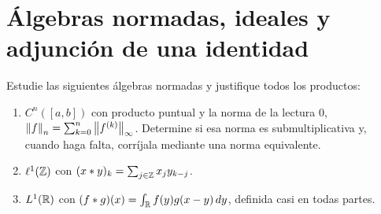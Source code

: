 \chapter{Álgebras normadas, ideales y adjunción de una identidad}

\begin{ejercicio}\label{ej:v3-l19-1}
Estudie las siguientes álgebras normadas y justifique todos los productos:
\begin{enumerate}
\item $C^n([a,b])$ con producto puntual y la norma de la lectura 0, $\left\lVert f\right\rVert_n=\sum_{k=0}^n\left\lVert f^{(k)}\right\rVert_\infty$. Determine si esa norma es submultiplicativa y, cuando haga falta, corríjala mediante una norma equivalente.
\item $\ell^1(\mathbb Z)$ con $(x*y)_k=\sum_{j\in\mathbb Z}x_jy_{k-j}$.
\item $L^1(\mathbb R)$ con $(f*g)(x)=\int_\mathbb R f(y)g(x-y)\,dy$, definida casi en todas partes.
\end{enumerate}
\end{ejercicio}
